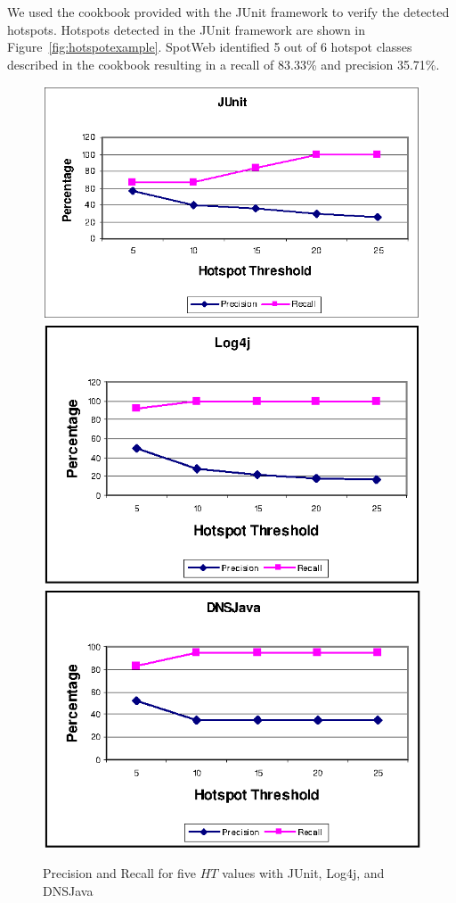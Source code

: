 We used the cookbook provided with the JUnit framework to verify the
detected hotspots. Hotspots detected in the JUnit framework are
shown in Figure~\ref{fig:hotspotexample}. SpotWeb identified 
5 out of 6 hotspot classes described in the cookbook resulting in a recall of
83.33\% and precision 35.71\%. 

\begin{figure}[t]
\centering
\includegraphics[scale=0.68,clip]{figs/junit.eps}
\includegraphics[scale=0.68,clip]{figs/log4j.eps}
\includegraphics[scale=0.68,clip]{figs/dnsjava.eps}
\caption{\label{fig:precrecall}Precision and Recall for five $HT$ values with JUnit, Log4j, and DNSJava} 
\end{figure}

